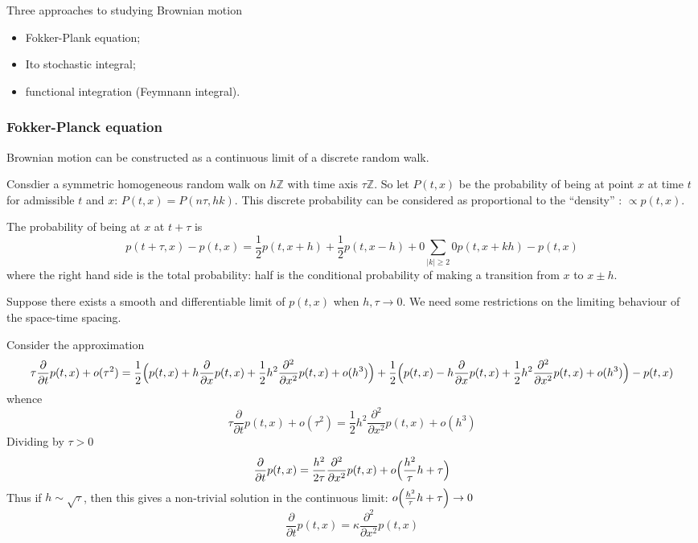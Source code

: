 \documentclass[a4paper]{article}
\begin{document}
Three approaches to studying Brownian motion \begin{itemize}
	\item Fokker-Plank equation;
	\item Ito stochastic integral;
	\item functional integration (Feymnann integral).
\end{itemize}


\subsubsection{Fokker-Planck equation} %
\label{ssub:fokker_planck_equation}

Brownian motion can be constructed as a continuous limit of a discrete random
walk.

Consdier a symmetric homogeneous random walk on $h \mathbb{Z}$ with time axis $\tau \mathbb{Z}$.
So let $P(t,x)$ be the probability of being at point $x$ at time $t$ for admissible
$t$ and $x$: $P(t,x) = P(n\tau, h k)$. This discrete probability can be considered
as proportional to the ``density'' : $\propto p(t,x)$.

The probability of being at $x$ at $t+\tau$ is 
\[p(t+\tau, x) - p(t, x) = \frac{1}{2} p(t, x + h) + \frac{1}{2} p(t, x - h) + 0 \sum_{|k|\geq2} 0 p(t,x+kh) - p(t, x)\]
where the right hand side is the total probability: half is the conditional
probability of making a transition from $x$ to $x\pm h$.

Suppose there exists a smooth and differentiable limit of $p(t,x)$ when $h,\tau\to 0$.
We need some restrictions on the limiting behaviour of the space-time spacing.

Consider the approximation
\[
\tau \frac{\partial}{\partial t} p(t,x) + o(\tau^2)
= \frac{1}{2}\Bigl( p(t,x) + h\frac{\partial}{\partial x} p(t,x) + \frac{1}{2}h^2\frac{\partial^2}{\partial x^2} p(t,x) + o(h^3) \Bigr)
+ \frac{1}{2}\Bigl( p(t,x) - h\frac{\partial}{\partial x} p(t,x) + \frac{1}{2}h^2\frac{\partial^2}{\partial x^2} p(t,x) + o(h^3) \Bigr)
- p(t,x)
\]
whence
\[ \tau \frac{\partial}{\partial t} p(t,x) + o(\tau^2) = \frac{1}{2}h^2\frac{\partial^2}{\partial x^2} p(t,x) + o(h^3) \]
Dividing by $\tau>0$
\[ \frac{\partial}{\partial t} p(t,x) = \frac{h^2}{2\tau}\frac{\partial^2}{\partial x^2} p(t,x) + o\Bigl(\frac{h^2}{\tau} h +  \tau\Bigr) \]
Thus if $h\sim \sqrt{\tau}$, then this gives a non-trivial solution in the
continuous limit: $o\Bigl(\frac{h^2}{\tau} h +  \tau\Bigr) \to 0$
\[ \frac{\partial}{\partial t} p(t,x) = \kappa \frac{\partial^2}{\partial x^2} p(t,x)\]
\end{document}
